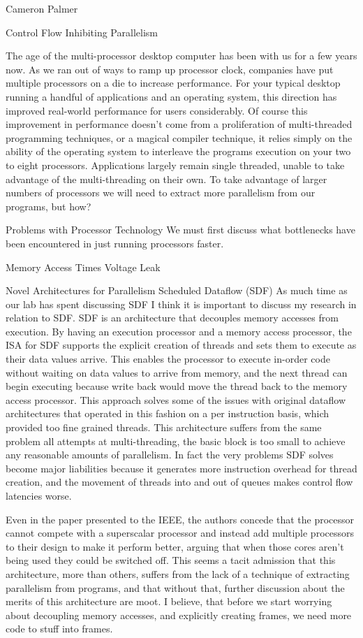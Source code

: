 Cameron Palmer

Control Flow Inhibiting Parallelism

The age of the multi-processor desktop computer has been with us for a few years now. As we ran out of ways to ramp up processor clock, companies have put multiple processors on a die to increase performance. For your typical desktop running a handful of applications and an operating system, this direction has improved real-world performance for users considerably. Of course this improvement in performance doesn’t come from a proliferation of multi-threaded programming techniques, or a magical compiler technique, it relies simply on the ability of the operating system to interleave the programs execution on your two to eight processors. Applications largely remain single threaded, unable to take advantage of the multi-threading on their own. To take advantage of larger numbers of processors we will need to extract more parallelism from our programs, but how?

Problems with Processor Technology
We must first discuss what bottlenecks have been encountered in just running processors faster.

Memory Access Times
Voltage Leak

Novel Architectures for Parallelism
Scheduled Dataflow (SDF)
As much time as our lab has spent discussing SDF I think it is important to discuss my research in relation to SDF. SDF is an architecture that decouples memory accesses from execution. By having an execution processor and a memory access processor, the ISA for SDF supports the explicit creation of threads and sets them to execute as their data values arrive. This enables the processor to execute in-order code without waiting on data values to arrive from memory, and the next thread can begin executing because write back would move the thread back to the memory access processor. This approach solves some of the issues with original dataflow architectures that operated in this fashion on a per instruction basis, which provided too fine grained threads. This architecture suffers from the same problem all attempts at multi-threading, the basic block is too small to achieve any reasonable amounts of parallelism. In fact the very problems SDF solves become major liabilities because it generates more instruction overhead for thread creation, and the movement of threads into and out of queues makes control flow latencies worse.

Even in the paper presented to the IEEE, the authors concede that the processor cannot compete with a superscalar processor and instead add multiple processors to their design to make it perform better, arguing that when those cores aren’t being used they could be switched off. This seems a tacit admission that this architecture, more than others, suffers from the lack of a technique of extracting parallelism from programs, and that without that, further discussion about the merits of this architecture are moot. I believe, that before we start worrying about decoupling memory accesses, and explicitly creating frames, we need  more code to stuff into frames. 

